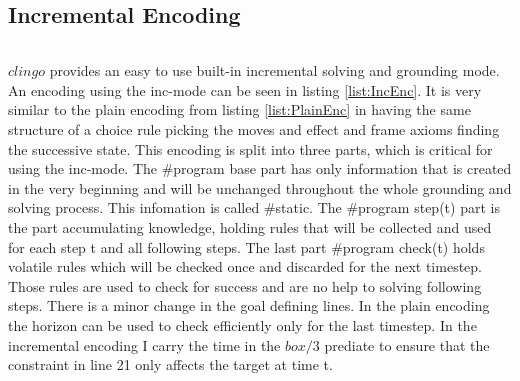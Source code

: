 \documentclass{report}
\begin{document}
\subsection{Incremental Encoding} \label{IncEnc}

\begin{lstlisting}[caption={Incremental Encoding},label=list:IncEnc]
\end{lstlisting}
$clingo$ provides an easy to use built-in incremental solving  and grounding mode. An encoding using the inc-mode can be seen in listing \ref{list:IncEnc}. It is very similar to the plain encoding from listing \ref{list:PlainEnc} in having the same structure of a choice rule picking the moves and effect and frame axioms finding the successive state. This encoding is split into three parts, which is critical for using the inc-mode. The \#program base part has only information that is created in the very beginning and will be unchanged throughout the whole grounding and solving process. This infomation is called \#static. The \#program step(t) part is the part accumulating knowledge, holding rules that will be collected and used for each step t and all following steps. The last part \#program check(t) holds volatile rules which will be checked once and discarded for the next timestep. Those rules are used to check for success and are no help to solving following steps.
There is a minor change in the goal defining lines. In the plain encoding the horizon can be used to check efficiently only for the last timestep. In the incremental encoding I carry the time in the $box/3$ prediate to ensure that the constraint in line 21 only affects the target at time t.
\end{document}
